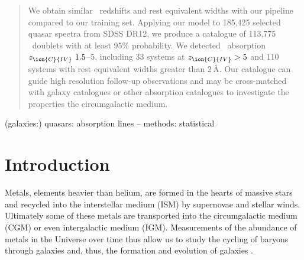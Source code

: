 \documentclass[fleqn,usenatbib]{mnras}
\newcommand{\civ}{\ion{C}{IV}}
\newcommand{\zciv}{z_{\civ}}
\begin{document}
\begin{abstract}
We obtain similar \civ~redshifts and rest equivalent widths with our pipeline compared to our training set. %
Applying our model %
to 185,425 selected quasar spectra from SDSS DR12, we produce a catalogue
of 113,775 \civ\ doublets with at least 95\% probability. We detected
\civ~absorption $\zciv ~ 1.5$--5, %
including $33$ systems at $\zciv > 5$ %
and
$110$ systems with rest equivalent widths greater than 2\,\AA. %
Our catalogue can guide high resolution follow-up observations and may be cross-matched with galaxy catalogues or other absorption catalogues to investigate the properties the circumgalactic medium.


\end{abstract}

\begin{keywords}
  (galaxies:) quasars: absorption lines -- methods: statistical
\end{keywords}



\section{Introduction}

Metals, elements heavier than helium, are formed in the hearts of
massive stars and recycled into the interstellar medium (ISM) by
supernovae and stellar winds. Ultimately some of these metals are
transported into the circumgalactic medium (CGM) or even intergalactic medium (IGM). %
Measurements of the abundance of metals in the
Universe over time thus allow us to study the
cycling of baryons through galaxies and, thus, the
formation and evolution of galaxies \citep{cgmPaper, baryonCycle}.
\end{document}
